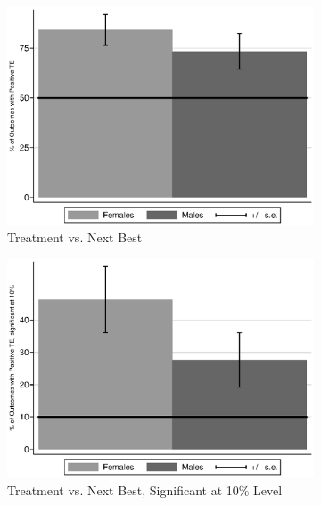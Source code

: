 \begin{figure}
\centering
\caption{Positively Impacted Outcomes, ABC/CARE Males and Females}\label{fig:ppositive}
\begin{subfigure}[h]{0.4\textwidth}
		\centering
		\caption{Treatment vs. Next Best} \label{fig:ppositivenb}
		\includegraphics[width=\textwidth]{output/itt_noctrl_all.eps}
\end{subfigure}%
\begin{subfigure}[h]{0.4\textwidth}
	\centering
	\caption{Treatment vs. Next Best, Significant at 10\% Level} \label{fig:ppositive10}
		\includegraphics[width=\textwidth]{output/itt_noctrl_all_sig10.eps}
\end{subfigure}
\begin{subfigure}[h]{0.4\textwidth}
		\centering

\end{subfigure}
\end{figure}
